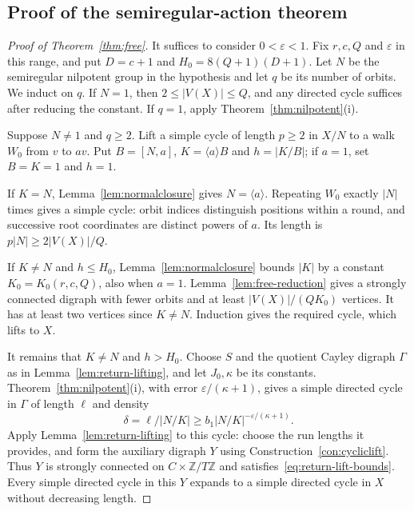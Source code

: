 \documentclass[11pt,a4paper,reqno]{amsart}
\theoremstyle{definition}
\theoremstyle{remark}
\numberwithin{equation}{section}
\newcommand{\Z}{\mathbb Z}
\newcommand{\gen}[1]{\langle #1\rangle}
\newcommand{\eps}{\varepsilon}
\begin{document}
\subsection{Proof of the semiregular-action theorem}
\begin{proof}[Proof of Theorem~\ref{thm:free}]
It suffices to consider $0<\eps<1$. Fix $r,c,Q$ and $\eps$ in this range, and put $D=c+1$ and $H_0=8(Q+1)(D+1)$. Let $N$ be the semiregular nilpotent group in the hypothesis and let $q$ be its number of orbits. We induct on $q$. If $N=1$, then $2\le|V(X)|\le Q$, and any directed cycle suffices after reducing the constant. If $q=1$, apply Theorem~\ref{thm:nilpotent}(i).

Suppose $N\ne1$ and $q\ge2$. Lift a simple cycle of length $p\ge2$ in $X/N$ to a walk $W_0$ from $v$ to $av$. Put $B=[N,a]$, $K=\gen aB$ and $h=|K/B|$; if $a=1$, set $B=K=1$ and $h=1$.

If $K=N$, Lemma~\ref{lem:normalclosure} gives $N=\gen a$. Repeating $W_0$ exactly $|N|$ times gives a simple cycle: orbit indices distinguish positions within a round, and successive root coordinates are distinct powers of $a$. Its length is $p|N|\ge2|V(X)|/Q$.

If $K\ne N$ and $h\le H_0$, Lemma~\ref{lem:normalclosure} bounds $|K|$ by a constant $K_0=K_0(r,c,Q)$, also when $a=1$. Lemma~\ref{lem:free-reduction} gives a strongly connected digraph with fewer orbits and at least $|V(X)|/(QK_0)$ vertices. It has at least two vertices since $K\ne N$. Induction gives the required cycle, which lifts to $X$.

It remains that $K\ne N$ and $h>H_0$. Choose $S$ and the quotient Cayley digraph $\Gamma$ as in Lemma~\ref{lem:return-lifting}, and let $J_0,\kappa$ be its constants. Theorem~\ref{thm:nilpotent}(i), with error $\eps/(\kappa+1)$, gives a simple directed cycle in $\Gamma$ of length $\ell$ and density
\begin{equation}\label{eq:freedensity}
 \delta=\ell/|N/K|\ge b_1|N/K|^{-\eps/(\kappa+1)}.
\end{equation}
Apply Lemma~\ref{lem:return-lifting} to this cycle: choose the run lengths it provides, and form the auxiliary digraph $Y$ using Construction~\ref{con:cycliclift}. Thus $Y$ is strongly connected on $C\times\Z/T\Z$ and satisfies~\eqref{eq:return-lift-bounds}. Every simple directed cycle in this $Y$ expands to a simple directed cycle in $X$ without decreasing length.


\end{proof}
\end{document}
